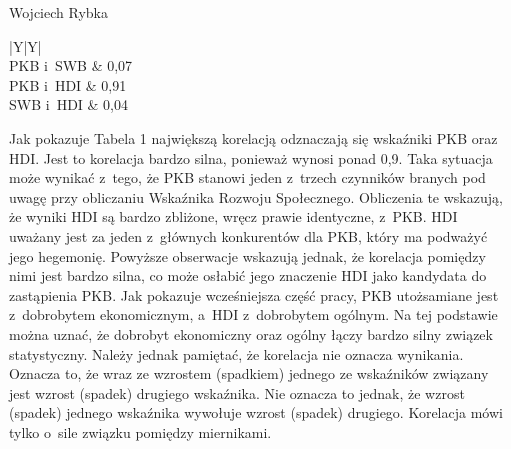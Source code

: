 \begin{artplenv}{Wojciech Rybka}
\captionsetup[table]{name=Tabela}
\begin{table}[H]
	\begin{tabularx}{\textwidth}{|Y|Y|}
		\hline
		\\\hline
		PKB i~SWB &
		0,07\\\hline
		PKB i~HDI &
		0,91\\\hline
		SWB i~HDI &
		0,04\\\hline
	\end{tabularx}
	
	\caption{Zależność pomiędzy danymi otrzymanymi ze wskaźników.
	Źródło: obliczenia własne na podstawie \label{ref:RND3IJCYKiYW3}(International Monetary Fund, 2019a; United Nations
	Development Programme, 2019; World Happiness Report, 2018)}
	\label{tab1:ryb}
\end{table}


%

Jak pokazuje Tabela 1 największą korelacją odznaczają się wskaźniki PKB oraz HDI. Jest to korelacja bardzo silna,
ponieważ wynosi ponad 0,9. Taka sytuacja może wynikać z~tego, że PKB stanowi jeden z~trzech czynników branych pod uwagę
przy obliczaniu Wskaźnika Rozwoju Społecznego. Obliczenia te wskazują, że wyniki HDI są bardzo zbliżone, wręcz prawie
identyczne, z~PKB. HDI uważany jest za jeden z~głównych konkurentów dla PKB, który ma podważyć jego hegemonię. Powyższe
obserwacje wskazują jednak, że korelacja pomiędzy nimi jest bardzo silna, co może osłabić jego znaczenie HDI jako
kandydata do zastąpienia PKB. Jak pokazuje wcześniejsza część pracy, PKB utożsamiane jest z~dobrobytem ekonomicznym,
a~HDI z~dobrobytem ogólnym. Na tej podstawie można uznać, że dobrobyt ekonomiczny oraz ogólny łączy bardzo silny związek
statystyczny. Należy jednak pamiętać, że korelacja nie oznacza wynikania. Oznacza to, że wraz ze wzrostem (spadkiem)
jednego ze wskaźników związany jest wzrost (spadek) drugiego wskaźnika. Nie oznacza to jednak, że wzrost (spadek)
jednego wskaźnika wywołuje wzrost (spadek) drugiego. Korelacja mówi tylko o~sile związku pomiędzy miernikami. 


\end{artplenv}
